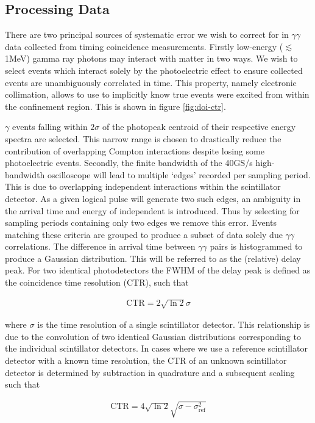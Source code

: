 \subsection{Processing Data}
There are two principal sources of systematic error we wish to correct for in $\gamma\gamma$ data collected from timing coincidence measurements. Firstly low-energy ($\lesssim$1MeV) gamma ray photons may interact with matter in two ways. We wish to select events which interact solely by the photoelectric effect to ensure collected events are unambiguously correlated in time. This property, namely electronic collimation, allows to use to implicitly know true events were excited from within the confinement region. This is shown in figure \ref{fig:doi-ctr}.

$\gamma$ events falling within $2\sigma$ of the photopeak centroid of their respective energy spectra are selected. This narrow range is chosen to drastically reduce the contribution of overlapping Compton interactions despite losing some photoelectric events. Secondly, the finite bandwidth of the 40GS/s high-bandwidth oscilloscope will lead to multiple `edges' recorded per sampling period. This is due to overlapping independent interactions within the scintillator detector. As a given logical pulse will generate two such edges, an ambiguity in the arrival time and energy of independent is introduced. Thus by selecting for sampling periods containing only two edges we remove this error. Events matching these criteria are grouped to produce a subset of data solely due $\gamma\gamma$ correlations. The difference in arrival time between $\gamma\gamma$ pairs is histogrammed to produce a Gaussian distribution. This will be referred to as the (relative) delay peak. For two identical photodetectors the FWHM of the delay peak is defined as the coincidence time resolution (CTR), such that

\begin{align}
\text{CTR} = 2\sqrt{\ln{2}}\sigma
\end{align}

where $\sigma$ is the time resolution of a single scintillator detector. This relationship is due to the convolution of two identical Gaussian distributions corresponding to the individual scintillator detectors. In cases where we use a reference scintillator detector with a known time resolution, the CTR of an unknown scintillator detector is determined by subtraction in quadrature and a subsequent scaling such that

\begin{align}
\text{CTR} = 4\sqrt{\ln{2}}\sqrt{\sigma-\sigma_\textrm{ref}^2}
\end{align}

